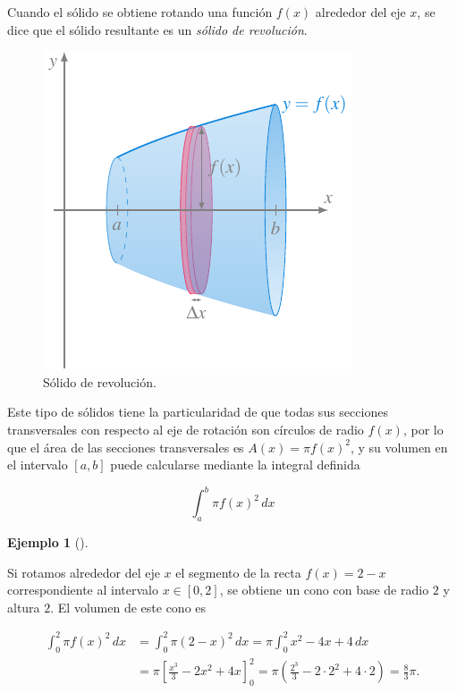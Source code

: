 \documentclass[
  a4paper,
]{scrreport}
\theoremstyle{definition}
\newtheorem{example}{Ejemplo}[chapter]
\theoremstyle{plain}
\theoremstyle{definition}
\theoremstyle{definition}
\theoremstyle{plain}
\theoremstyle{plain}
\theoremstyle{remark}
\begin{document}
Cuando el sólido se obtiene rotando una función \(f(x)\) alrededor del
eje \(x\), se dice que el sólido resultante es un \emph{sólido de
revolución}.

\begin{figure}[H]

{\centering \includegraphics{img/integrales/disco-solido-revolucion.pdf}

}

\caption{Sólido de revolución.}

\end{figure}%

Este tipo de sólidos tiene la particularidad de que todas sus secciones
transversales con respecto al eje de rotación son círculos de radio
\(f(x)\), por lo que el área de las secciones transversales es
\(A(x)=\pi f(x)^2\), y su volumen en el intervalo \([a,b]\) puede
calcularse mediante la integral definida

\[
\int_a^b \pi f(x)^2\,dx
\]

\begin{example}[]\protect\hypertarget{exm-volumen-cono-revolucion}{}\label{exm-volumen-cono-revolucion}

Si rotamos alrededor del eje \(x\) el segmento de la recta \(f(x)=2-x\)
correspondiente al intervalo \(x\in[0,2]\), se obtiene un cono con base
de radio \(2\) y altura \(2\). El volumen de este cono es

\begin{align*}
\int_0^2 \pi f(x)^2\,dx 
&= \int_0^2 \pi (2-x)^2\,dx 
= \pi \int_0^2 x^2-4x+4\,dx \\
&= \pi \left[\frac{x^3}{3}-2x^2+4x\right]_0^2
= \pi\left(\frac{2^3}{3}-2\cdot 2^2+4\cdot 2\right) 
= \frac{8}{3}\pi.
\end{align*}

\end{example}
\end{document}
